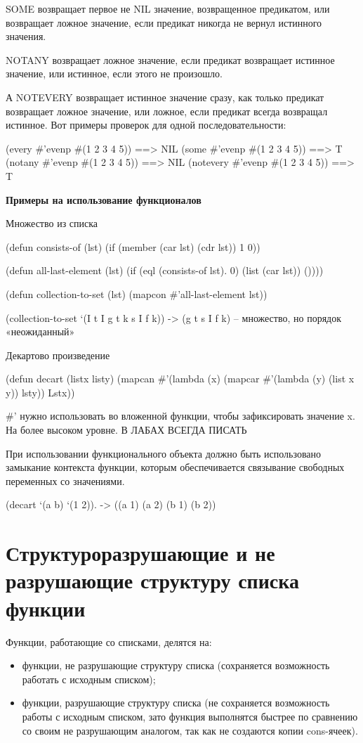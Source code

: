 \documentclass[12pt]{report}
\begin{document}
SOME возвращает первое не NIL значение, возвращенное предикатом, или возвращает ложное значение, если предикат никогда не вернул истинного значения. 

NOTANY возвращает ложное значение, если предикат возвращает истинное значение, или истинное, если этого не произошло.

А NOTEVERY возвращает истинное значение сразу, как только предикат возвращает ложное значение, или ложное, если предикат всегда возвращал истинное. Вот примеры проверок для одной последовательности:

(every \#'evenp \#(1 2 3 4 5)) ==> NIL
(some \#'evenp \#(1 2 3 4 5)) ==> T
(notany \#'evenp \#(1 2 3 4 5)) ==> NIL
(notevery \#'evenp \#(1 2 3 4 5)) ==> T



\textbf{Примеры на использование функционалов}

Множество из списка

(defun consists-of (lst) (if (member (car lst) (cdr lst)) 1 0))

(defun all-last-element (lst)
(if (eql (consists-of lst). 0) (list (car lst)) ())))

(defun collection-to-set (lst)
(mapcon \#’all-last-element lst))

(collection-to-set ‘(I t I g t k s I f k)) -> (g t s I f k) – множество, но порядок «неожиданный»


Декартово произведение

(defun decart (listx listy) 
(mapcan \#’(lambda (x)
(mapcar \#’(lambda (y)
(list x y)) lsty))
Lstx))

\#’ нужно использовать во вложенной функции, чтобы зафиксировать значение x. На более высоком уровне. В ЛАБАХ ВСЕГДА ПИСАТЬ

При использовании функционального объекта должно быть использовано замыкание контекста функции, которым обеспечивается связывание свободных переменных со значениями.

(decart ‘(a b) ‘(1 2)). -> ((a 1) (a 2) (b 1) (b 2))



\section*{Структуроразрушающие и не разрушающие структуру списка функции}

Функции, работающие со списками, делятся на:
\begin{itemize}
	\item функции, не разрушающие структуру списка (сохраняется возможность работать с исходным списком);
	\item функции, разрушающие структуру списка (не сохраняется возможность работы с исходным списком, зато функция выполнятся быстрее по сравнению со своим не разрушающим аналогом, так как не создаются копии cons-ячеек).
\end{itemize}
\end{document}
